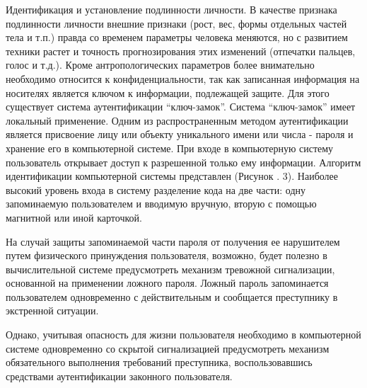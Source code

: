 \documentclass[a4paper,12pt]{extarticle}
\begin{document}
	Идентификация и установление подлинности личности. В качестве признака подлинности личности внешние признаки (рост, вес, формы отдельных частей тела и т.п.) правда со временем параметры человека меняются, но с развитием техники растет и точность прогнозирования этих изменений (отпечатки пальцев, голос и т.д.). Кроме антропологических параметров более внимательно необходимо относится к конфиденциальности, так как записанная информация на носителях является ключом к информации, подлежащей защите. Для этого существует система аутентификации “ключ-замок”. Система “ключ-замок” имеет локальный применение. Одним из распространенным методом аутентификации является присвоение лицу или объекту уникального имени или числа - пароля и хранение его в компьютерной системе. При входе в компьютерную систему пользователь открывает доступ к разрешенной только ему информации. 
	Алгоритм идентификации компьютерной системы представлен (Рисунок . 3). Наиболее высокий уровень входа в систему разделение кода на две части: одну запоминаемую пользователем и вводимую вручную, вторую с помощью магнитной или иной карточкой.
	
	На случай защиты запоминаемой части пароля от получения ее нарушителем путем физического принуждения пользователя, возможно, будет полезно в вычислительной системе предусмотреть механизм тревожной сигнализации, основанной на применении ложного пароля. Ложный пароль запоминается пользователем одновременно с действительным и сообщается преступнику в экстренной ситуации.
	
	Однако, учитывая опасность для жизни пользователя необходимо в компьютерной системе одновременно со скрытой сигнализацией предусмотреть механизм обязательного выполнения требований преступника, воспользовавшись средствами аутентификации законного пользователя.
	
\end{document}
